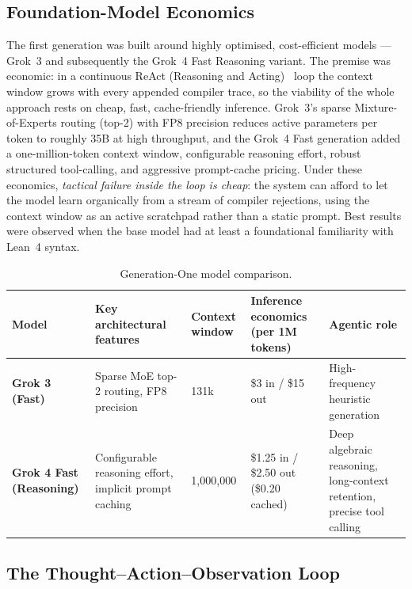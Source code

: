 \documentclass[12pt, a4paper]{article}
\begin{document}
\subsection{Foundation-Model Economics}

The first generation was built around highly optimised, cost-efficient
models --- Grok~3 and subsequently the Grok~4 Fast Reasoning variant. The
premise was economic: in a continuous ReAct (Reasoning and
Acting)~\cite{yao2023react} loop the
context window grows with every appended compiler trace, so the viability of
the whole approach rests on cheap, fast, cache-friendly inference. Grok~3's
sparse Mixture-of-Experts routing (top-2) with FP8 precision reduces active
parameters per token to roughly 35B at high throughput, and the Grok~4 Fast
generation added a one-million-token context window, configurable reasoning
effort, robust structured tool-calling, and aggressive prompt-cache pricing.
Under these economics, \emph{tactical failure inside the loop is cheap}:
the system can afford to let the model learn organically from a stream of
compiler rejections, using the context window as an active scratchpad rather
than a static prompt. Best results were observed when the base model had at
least a foundational familiarity with Lean~4 syntax.

\begin{table}[H]
  \centering
  \caption{Generation-One model comparison.}
  \label{tab:models}
  \renewcommand{\arraystretch}{1.4}
  \begin{tabular}{>{\bfseries}p{2.6cm} p{4.2cm} p{2.0cm} p{2.9cm} p{3.2cm}}
    \toprule
    Model & Key architectural features & Context window &
    Inference economics (per 1M tokens) & Agentic role \\
    \midrule
    Grok 3 (Fast) &
      Sparse MoE top-2 routing, FP8 precision &
      131k &
      \$3 in / \$15 out &
      High-frequency heuristic generation \\
    Grok 4 Fast (Reasoning) &
      Configurable reasoning effort, implicit prompt caching &
      1{,}000{,}000 &
      \$1.25 in / \$2.50 out (\$0.20 cached) &
      Deep algebraic reasoning, long-context retention, precise tool calling \\
    \bottomrule
  \end{tabular}
\end{table}

\subsection{The Thought--Action--Observation Loop}
\end{document}
